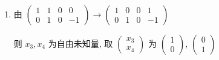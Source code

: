 	 \paragraph{} %
		 \begin{enumerate}
			 \item %
			       由 $ \begin{pmatrix}
					       1 & 1 & 0 & 0  \\
					       0 & 1 & 0 & -1
				       \end{pmatrix} \rightarrow \begin{pmatrix}
					       1 & 0 & 0 & 1  \\
					       0 & 1 & 0 & -1
				       \end{pmatrix} $

			       则 $x_{3}, x_{4}$ 为自由未知量, 取 $ \begin{pmatrix}
					       x_{3} \\
					       x_{4}
				       \end{pmatrix} $ 为 $ \begin{pmatrix}
					       1 \\
					       0
				       \end{pmatrix} $, $ \begin{pmatrix}
					       0 \\
					       1
				       \end{pmatrix} $


\end{enumerate}
